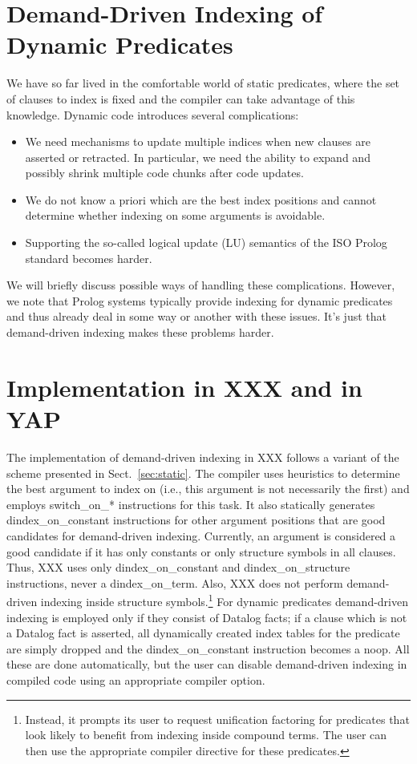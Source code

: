 \documentclass{llncs}
\newcommand{\instr}[1]{\textsf{#1}}
\newcommand{\switchSTAR}{\mbox{\instr{switch\_on\_*}}\xspace}
\newcommand{\jitiONterm}{\mbox{\instr{dindex\_on\_term}}\xspace}
\newcommand{\jitiONconstant}{\mbox{\instr{dindex\_on\_constant}}\xspace}
\newcommand{\jitiONstructure}{\mbox{\instr{dindex\_on\_structure}}\xspace}
\newcommand{\JITI}{demand-driven indexing\xspace}
\begin{document}
\section{Demand-Driven Indexing of Dynamic Predicates} \label{sec:dynamic}
We have so far lived in the comfortable world of static predicates,
where the set of clauses to index is fixed and the compiler can take
advantage of this knowledge. Dynamic code introduces several
complications:
\begin{itemize}
\item We need mechanisms to update multiple indices when new clauses
  are asserted or retracted. In particular, we need the ability to
  expand and possibly shrink multiple code chunks after code updates.
\item We do not know a priori which are the best index positions and
  cannot determine whether indexing on some arguments is avoidable.
\item Supporting the so-called logical update (LU) semantics of the
  ISO Prolog standard becomes harder.
\end{itemize}
We will briefly discuss possible ways of handling these complications.
However, we note that Prolog systems typically provide indexing for
dynamic predicates and thus already deal in some way or another with
these issues. It's just that \JITI makes these problems harder.


\section{Implementation in XXX and in YAP} \label{sec:impl}
The implementation of \JITI in XXX follows a variant of the scheme
presented in Sect.~\ref{sec:static}. The compiler uses heuristics to
determine the best argument to index on (i.e., this argument is not
necessarily the first) and employs \switchSTAR instructions for this
task. It also statically generates \jitiONconstant instructions for
other argument positions that are good candidates for \JITI.
Currently, an argument is considered a good candidate if it has only
constants or only structure symbols in all clauses. Thus, XXX uses
only \jitiONconstant and \jitiONstructure instructions, never a
\jitiONterm. Also, XXX does not perform \JITI inside structure
symbols.\footnote{Instead, it prompts its user to request unification
factoring for predicates that look likely to benefit from indexing
inside compound terms. The user can then use the appropriate compiler
directive for these predicates.} For dynamic predicates \JITI is
employed only if they consist of Datalog facts; if a clause which is
not a Datalog fact is asserted, all dynamically created index tables
for the predicate are simply dropped and the \jitiONconstant
instruction becomes a \instr{noop}. All these are done automatically,
but the user can disable \JITI in compiled code using an appropriate
compiler option.
\end{document}
